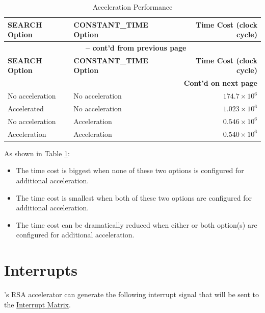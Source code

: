 \documentclass[main\_\_EN.tex]{subfiles}
\begin{document}
\begin{longtable}{ | l | l | r | }
    \caption{Acceleration Performance}\label{tab:accelerationeffect}
    \\\hline
    \rowcolor{lightgray}
        \textbf{SEARCH Option} & \textbf{CONSTANT\_TIME Option} & \textbf{Time Cost (clock cycle)}  \\ \hline
        \endfirsthead
        \multicolumn{3}{c}{\bfseries \tablename\ \thetable{} -- cont'd from previous page}\\\hline

        \rowcolor{lightgray}
        \textbf{SEARCH Option} & \textbf{CONSTANT\_TIME Option} & \textbf{Time Cost (clock cycle)}  \\ \hline
        \endhead

        \multicolumn{3}{r}{\textbf{Cont'd on next page}} \\
        \endfoot
        \endlastfoot
        \hline
    No acceleration & No acceleration   & $174.7 \times 10^6$   \\ \hline
    Accelerated     & No acceleration   & $1.023 \times 10^6$   \\ \hline
    No acceleration & Acceleration      & $0.546 \times 10^6$   \\ \hline
    Acceleration    & Acceleration      & $0.540 \times 10^6$   \\ \hline
\end{longtable}

As shown in Table \ref{tab:accelerationeffect}:

\begin{itemize}
    \item The time cost is biggest when none of these two options is configured for additional acceleration.
    \item The time cost is smallest when both of these two options are configured for additional acceleration.
    \item The time cost can be dramatically reduced when either or both option(s) are configured for additional acceleration.
\end{itemize}



\section{Interrupts}

\chipname{}'s RSA accelerator can generate the following interrupt signal that will be sent to the \hyperref[mod:intmtrx]{Interrupt Matrix}.
\end{document}

